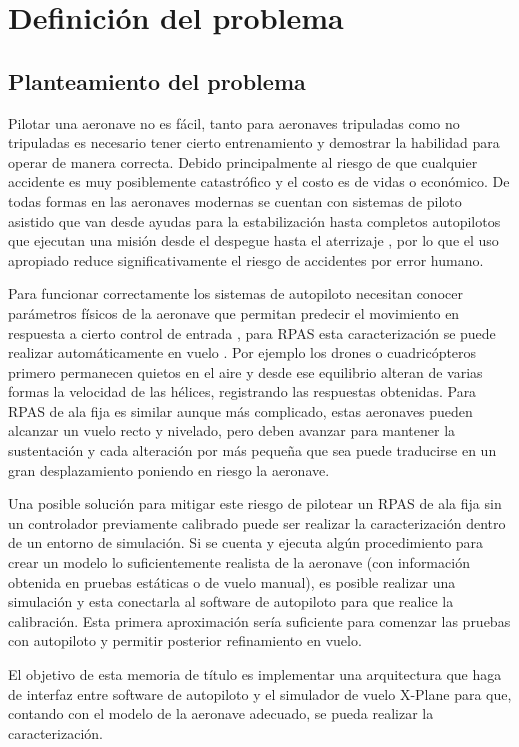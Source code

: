\chapter{Definición del problema}
\section{Planteamiento del problema}
Pilotar una aeronave no es fácil, tanto para aeronaves tripuladas como no tripuladas es necesario tener cierto entrenamiento y demostrar la habilidad para operar de manera correcta. Debido principalmente al riesgo de que cualquier accidente es muy posiblemente catastrófico y el costo es de vidas o económico. De todas formas en las aeronaves modernas se cuentan con sistemas de piloto asistido que van desde ayudas para la  estabilización hasta completos autopilotos que ejecutan una misión desde el despegue hasta el aterrizaje \cite{autopilot-ai}, por lo que el uso apropiado reduce significativamente el riesgo de accidentes por error humano.

Para funcionar correctamente los sistemas de autopiloto necesitan conocer parámetros físicos de la aeronave que permitan predecir el movimiento en respuesta a cierto control de entrada \cite{fpvtuning}, para RPAS esta caracterización se puede realizar automáticamente en vuelo \cite{px4-autotuning}. Por ejemplo los drones o cuadricópteros primero permanecen quietos en el aire y desde ese equilibrio alteran de varias formas la velocidad de las hélices, registrando las respuestas obtenidas. Para RPAS de ala fija es similar aunque más complicado, estas aeronaves pueden alcanzar un vuelo recto y nivelado, pero deben avanzar para mantener la sustentación y cada alteración por más pequeña que sea puede traducirse en un gran desplazamiento poniendo en riesgo la aeronave.

Una posible solución para mitigar este riesgo de pilotear un RPAS de ala fija sin un controlador previamente calibrado puede ser realizar la caracterización dentro de un entorno de simulación. Si se cuenta y ejecuta algún procedimiento para crear un modelo lo suficientemente realista de la aeronave (con información obtenida en pruebas estáticas o de vuelo manual), es posible realizar una simulación y esta conectarla al software de autopiloto para que realice la calibración. Esta primera aproximación sería suficiente para comenzar las pruebas con autopiloto y permitir posterior refinamiento en vuelo.

El objetivo de esta memoria de título es implementar una arquitectura que haga de interfaz entre software de autopiloto y el simulador de vuelo X-Plane para que, contando con el modelo de la aeronave adecuado, se pueda realizar la caracterización.

